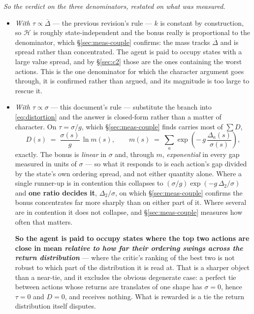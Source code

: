 \documentclass{article}
\newcommand{\h}{\mathcal{H}}
\newcommand{\gap}{\Delta}
\newcommand{\gapbar}{\overline{\Delta}}
\newcommand{\srank}{\sigma}
\begin{document}
\emph{So the verdict on the three denominators, restated on what was measured.}
\begin{itemize}
  \item \emph{With $\tau \propto \gapbar$} --- the previous revision's rule --- $k$ is constant
  by construction, so $\h$ is roughly state-independent and the bonus really is proportional to
  the denominator, which \S\ref{sec:meas-couple} confirms: the mass tracks $\gapbar$ and is
  spread rather than concentrated. The agent is paid to occupy states with a large value spread,
  and by \S\ref{sec:c2} those are the ones containing the worst actions. This is the one
  denominator for which the character argument goes through, it is confirmed rather than argued,
  and its magnitude is too large to rescue it.
  \item \emph{With $\tau \propto \srank$} --- this document's rule --- substitute the branch into
  \eqref{eq:distortion} and the answer is closed-form rather than a matter of character. On
  $\tau = \srank/g$, which \S\ref{sec:meas-couple} finds carries most of $\sum D$,
  \[
    D(s) \;=\; \frac{\srank(s)}{g}\,\ln m(s),
    \qquad
    m(s) \;=\; \sum_a \exp\!\left(-\,g\,\frac{\gap_a(s)}{\srank(s)}\right),
  \]
  exactly. The bonus is \emph{linear} in $\srank$ and, through $m$, \emph{exponential} in every
  gap measured in units of $\srank$ --- so what it responds to is each action's gap divided by
  the state's own ordering spread, and not either quantity alone. Where a single runner-up is in
  contention this collapses to $(\srank/g)\exp(-g\,\gap_2/\srank)$ and \textbf{one ratio decides
  it}, $\gap_2/\srank$, on which \S\ref{sec:meas-couple} confirms the bonus concentrates far more
  sharply than on either part of it. Where several are in contention it does not collapse, and
  \S\ref{sec:meas-couple} measures how often that matters.

  \textbf{So the agent is paid to occupy states where the top two actions are close in mean
  \emph{relative to how far their ordering swings across the return distribution}} --- where the
  critic's ranking of the best two is not robust to which part of the distribution it is read at.
  That is a sharper object than a near-tie, and it excludes the obvious degenerate case: a perfect
  tie between actions whose returns are translates of one shape has $\srank = 0$, hence $\tau = 0$
  and $D = 0$, and receives nothing. What is rewarded is a tie the return distribution itself
  disputes.


\end{itemize}
\end{document}
